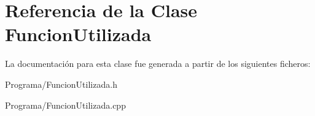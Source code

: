 \hypertarget{class_funcion_utilizada}{\section{Referencia de la Clase Funcion\-Utilizada}
\label{class_funcion_utilizada}
}


La documentación para esta clase fue generada a partir de los siguientes ficheros\-:\begin{DoxyCompactItemize}
\item 
Programa/Funcion\-Utilizada.\-h\item 
Programa/Funcion\-Utilizada.\-cpp\end{DoxyCompactItemize}
